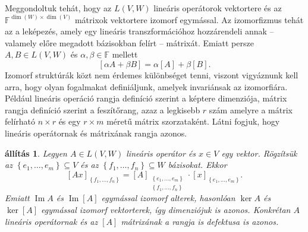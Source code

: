 \documentclass[a4paper, showtrims]{memoir}
\theoremstyle{plain}
\newtheorem{proposition}{állítás}[chapter]
\theoremstyle{remark}
\theoremstyle{definition}
\DeclareMathOperator{\im}{Im}
\begin{document}
Meggondoltuk tehát, hogy az $L\left( V,W \right)$ lineáris operátorok vektortere 
és az
$\mathbb{F}^{\dim(W)\times \dim(V)}$ mátrixok vektortere
izomorf egymással.
Az izomorfizmus tehát az a leképezés,
amely egy lineáris transzformációhoz hozzárendeli annak
-- valamely előre megadott bázisokban felírt --
mátrixát.
Emiatt persze $A,B\in L\left( V,W \right)$ és $\alpha,\beta\in\mathbb{F}$ mellett
\begin{equation}\label{eq:vt}
	\left[ \alpha A+\beta B \right]=\alpha\left[ A \right]+\beta\left[ B \right].
\end{equation}
Izomorf struktúrák közt nem érdemes különbséget tenni, viszont vigyáznunk kell arra,
hogy olyan fogalmakat definiáljunk, amelyek invariánsak az izomorfiára.
Például lineáris operáció rangja definíció szerint a képtere dimenziója,
mátrix rangja definíció szerint a feszítőrang, azaz a legkisebb
$r$ szám amelyre a mátrix felírható $n\times r$ és egy $r\times m$ méretű mátrix szorzataként.
Látni fogjuk, hogy lineáris operátornak és mátrixának rangja azonos.
\begin{proposition}
	Legyen $A\in L\left( V,W \right)$ lineáris operátor és $x\in V$ egy vektor.
	Rögzítsük az $\left\{ e_1,\ldots,e_m \right\}\subseteq V$ és az $\left\{ f_1,\ldots,f_n \right\}\subseteq W$ bázisokat.
	Ekkor
	\[
		[Ax]_{\left\{ f_1,\ldots,f_n \right\}}
		=
		[A]_{\substack{\left\{ e_1,\ldots,e_m \right\}\\ \left\{ f_1,\ldots,f_n \right\}}}
		\cdot
		[x]_{\left\{ e_1,\ldots,e_m \right\}}.
	\]
	Emiatt $\im A$ és $\im[A]$ egymással izomorf alterek, hasonlóan $\ker A$ és $\ker[A]$ egymással
	izomorf vektorterek, így dimenziójuk is azonos.
	Konkrétan $A$ lineáris operátornak és az $[A]$ mátrixának a rangja is defektusa is azonos.
\end{proposition}
\end{document}
